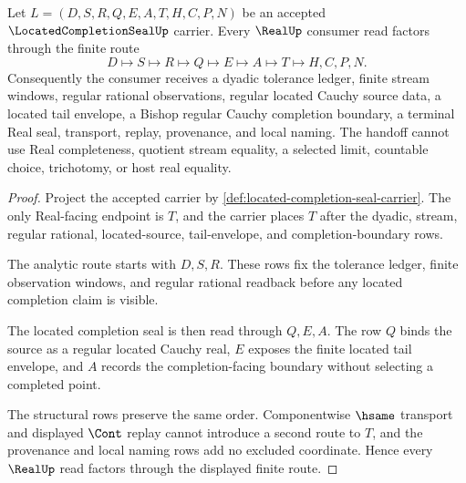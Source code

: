 \begin{theorem}
\label{thm:located-completion-seal-real-handoff}
Let $L=(D,S,R,Q,E,A,T,H,C,P,N)$ be an accepted $\LocatedCompletionSealUp$ carrier. Every $\RealUp$ consumer read factors through the finite route
$$
D \longmapsto S \longmapsto R \longmapsto Q \longmapsto E \longmapsto A \longmapsto T \longmapsto H,C,P,N .
$$
Consequently the consumer receives a dyadic tolerance ledger, finite stream windows, regular rational observations, regular located Cauchy source data, a located tail envelope, a Bishop regular Cauchy completion boundary, a terminal Real seal, transport, replay, provenance, and local naming. The handoff cannot use Real completeness, quotient stream equality, a selected limit, countable choice, trichotomy, or host real equality.
\end{theorem}
\begin{proof}
Project the accepted carrier by \autoref{def:located-completion-seal-carrier}. The only Real-facing endpoint is $T$, and the carrier places $T$ after the dyadic, stream, regular rational, located-source, tail-envelope, and completion-boundary rows.

The analytic route starts with $D,S,R$. These rows fix the tolerance ledger, finite observation windows, and regular rational readback before any located completion claim is visible.

The located completion seal is then read through $Q,E,A$. The row $Q$ binds the source as a regular located Cauchy real, $E$ exposes the finite located tail envelope, and $A$ records the completion-facing boundary without selecting a completed point.

The structural rows preserve the same order. Componentwise $\hsame$ transport and displayed $\Cont$ replay cannot introduce a second route to $T$, and the provenance and local naming rows add no excluded coordinate. Hence every $\RealUp$ read factors through the displayed finite route.
\end{proof}


